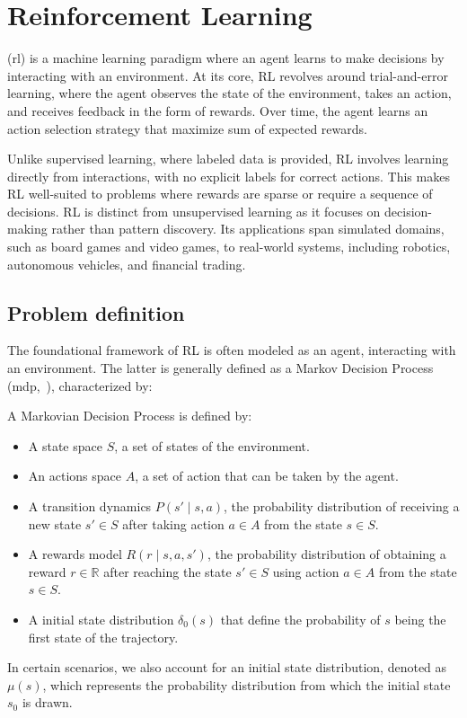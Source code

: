 \section{Reinforcement Learning}\label{section:bg:reinforcement-learning}

 (\acrshort{rl}) is a machine learning paradigm where an agent learns to make
decisions by interacting with an environment.
At its core, RL revolves around trial-and-error learning, where the agent observes the state of the
environment, takes an action, and receives feedback in the form of rewards.
Over time, the agent learns an action selection strategy that maximize sum of expected rewards.

Unlike supervised learning, where labeled data is provided, RL involves learning directly from interactions, with no
explicit labels for correct actions.
This makes RL well-suited to problems where rewards are sparse or require a sequence of decisions.
RL is distinct from unsupervised learning as it focuses on decision-making rather than pattern discovery.
Its applications span simulated domains, such as board games and video games, to real-world systems, including robotics,
autonomous vehicles, and financial trading.

\subsection{Problem definition}\label{subsection:bg:rl:problem_def}

The foundational framework of RL is often modeled as an agent, interacting with an environment.
The latter is generally defined as a Markov Decision Process (\acrshort{mdp},~\citep{bellman1957markovian}), characterized by:
\begin{definition}[MDP]\label{definition:bg:rl:mdp} A Markovian Decision Process is defined by:
\begin{itemize}
    \item A state space $S$, a set of states of the environment.
    \item An actions space $A$, a set of action that can be taken by the agent.
    \item A transition dynamics $P(s' \mid s,a)$, the probability distribution of receiving a new state $s' \in S$ after
taking action $a \in A$ from the state $s \in S$.
    \item A rewards model $R(r \mid s, a, s')$, the probability distribution of obtaining a reward $r\in \mathbb{R}$ after
reaching the state $s' \in S$ using action $a \in A$ from the state $s \in S$.
    \item A initial state distribution $\delta_0(s)$ that define the probability of $s$ being the first state of the
    trajectory.
\end{itemize}
\end{definition}
In certain scenarios, we also account for an initial state distribution, denoted as $\mu(s)$, which represents the
probability distribution from which the initial state $s_0$ is drawn.

